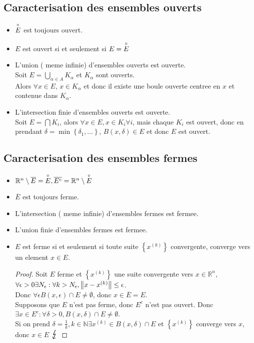 \documentclass[../main.tex]{subfiles}
\begin{document}
\subsection{Caracterisation des ensembles ouverts}
\begin{itemize}
	\item $\overset{\circ}{E}$ est toujours ouvert.
	\item $E$ est ouvert si et seulement si $E = \overset{\circ}{E}$
	\item L'union ( meme infinie) d'ensembles ouverts est ouverte.\\
	Soit $E = \bigcup_{\alpha\in A} K_\alpha$ et $K_\alpha$ sont ouverts.\\
	Alors $\forall x \in E$, $x \in K_\alpha$ et donc il existe une boule ouverte centree en  $x$ et contenue dans $K_\alpha$.
\item L'intersection finie d'ensembles ouverts est ouverte.\\
	Soit $E= \bigcap K_i$, alors $\forall x \in E, x \in K_i \forall i$, mais chaque $K_i$ est ouvert, donc en prendant $\delta = \min \left\{ \delta_1,\ldots \right\} $, $B( x,\delta) \in E$ et donc $E$ est ouvert.
\end{itemize}
\subsection{Caracterisation des ensembles fermes}
\begin{itemize}
\item $ \mathbb{R}^n\setminus \overline{E} = \overset{\circ}{E}, \overline{E^{c}}= \mathbb{R}^n\setminus \overset{\circ}{E}$ 
\item $\overline{E}$ est toujours ferme.
\item L'intersection ( meme infinie) d'ensembles fermes est fermee.
\item L'union finie d'ensembles fermes est fermee.
\item $E$ est ferme si et seulement si toute suite $ \left\{ x^{( k) } \right\} $ convergente, converge vers un element $x \in E.$
\begin{proof}
	Soit $E$ ferme et $ \left\{ x^{( k) } \right\} $ une suite convergente vers $x \in \mathbb{R}^n$, $\forall \epsilon>0 \exists N_\epsilon: \forall k >N_\epsilon, \left\lVert x-x^{( k) }\right\rVert \leq \epsilon$.\\
	Donc $\forall \epsilon B( x,\epsilon) \cap E \neq \emptyset $, donc $x \in \overline{E}=E$.\\
	Supposons que $E$ n'est pas ferme, donc $E^{c}$ n'est pas ouvert.
	Donc $\exists x \in E^{c} : \forall \delta>0, B( x,\delta) \cap E \neq \emptyset $.\\
	Si on prend $\delta= \frac{1}{k}, k\in \mathbb{N} \exists x^{( k) }\in B( x,\delta) \cap E$ et $ \left\{ x^{( k) } \right\} $ converge vers $x$, donc $x \in E$ $\contra$
\end{proof}

\end{itemize}
\end{document}
